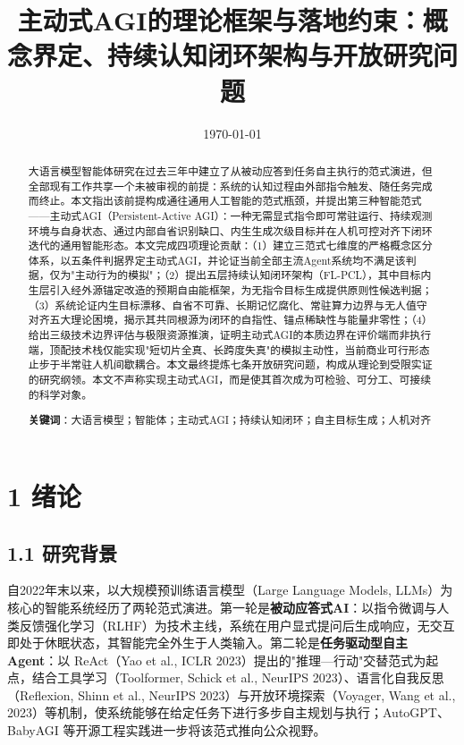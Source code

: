 \documentclass[11pt,a4paper]{ctexart}
\begin{document}
\title{主动式AGI的理论框架与落地约束：概念界定、持续认知闭环架构与开放研究问题}

\author{}

\date{\today}

\maketitle

\begin{abstract}


大语言模型智能体研究在过去三年中建立了从被动应答到任务自主执行的范式演进，但全部现有工作共享一个未被审视的前提：系统的认知过程由外部指令触发、随任务完成而终止。本文指出该前提构成通往通用人工智能的范式瓶颈，并提出第三种智能范式——主动式AGI（Persistent-Active AGI）：一种无需显式指令即可常驻运行、持续观测环境与自身状态、通过内部自省识别缺口、内生生成次级目标并在人机可控对齐下闭环迭代的通用智能形态。本文完成四项理论贡献：（1）建立三范式七维度的严格概念区分体系，以五条件判据界定主动式AGI，并论证当前全部主流Agent系统均不满足该判据，仅为"主动行为的模拟"；（2）提出五层持续认知闭环架构（FL-PCL），其中目标内生层引入经外源锚定改造的预期自由能框架，为无指令目标生成提供原则性候选判据；（3）系统论证内生目标漂移、自省不可靠、长期记忆腐化、常驻算力边界与无人值守对齐五大理论困境，揭示其共同根源为闭环的自指性、锚点稀缺性与能量非零性；（4）给出三级技术边界评估与极限资源推演，证明主动式AGI的本质边界在评价端而非执行端，顶配技术栈仅能实现"短切片全真、长跨度失真"的模拟主动性，当前商业可行形态止步于半常驻人机间歇耦合。本文最终提炼七条开放研究问题，构成从理论到受限实证的研究纲领。本文不声称实现主动式AGI，而是使其首次成为可检验、可分工、可接续的科学对象。

\par\noindent \textbf{关键词}：大语言模型；智能体；主动式AGI；持续认知闭环；自主目标生成；人机对齐
\end{abstract}

\section{1 绪论}

\subsection{1.1 研究背景}

自2022年末以来，以大规模预训练语言模型（Large Language Models, LLMs）为核心的智能系统经历了两轮范式演进。第一轮是\textbf{被动应答式AI}：以指令微调与人类反馈强化学习（RLHF）为技术主线，系统在用户显式提问后生成响应，无交互即处于休眠状态，其智能完全外生于人类输入。第二轮是\textbf{任务驱动型自主Agent}：以 ReAct（Yao et al., ICLR 2023）提出的"推理—行动"交替范式为起点，结合工具学习（Toolformer, Schick et al., NeurIPS 2023）、语言化自我反思（Reflexion, Shinn et al., NeurIPS 2023）与开放环境探索（Voyager, Wang et al., 2023）等机制，使系统能够在给定任务下进行多步自主规划与执行；AutoGPT、BabyAGI 等开源工程实践进一步将该范式推向公众视野。
\end{document}
